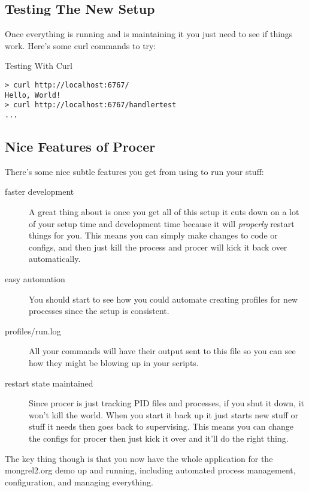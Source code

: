 \subsection{Testing The New Setup}

Once everything is running and  is maintaining it you 
just need to see if things work.  Here's some curl commands to try:

\begin{code}{Testing With Curl}
\begin{Verbatim}
> curl http://localhost:6767/
Hello, World!
> curl http://localhost:6767/handlertest
...
\end{Verbatim}
\end{code}


\subsection{Nice Features of Procer}

There's some nice subtle features you get from using 
to run your stuff:

\begin{description}
\item [faster development]  A great thing about  is once you get all of this setup
    it cuts down on a lot of your setup time and development time because
    it will \emph{properly} restart things for you.  This means you can
    simply make changes to code or configs, and then just kill the process and
    procer will kick it back over automatically.
\item [easy automation]  You should start to see how you could automate creating
    profiles for new processes since the setup is consistent.
\item [profiles/run.log]  All your commands will have their output sent to
    this file so you can see how they might be blowing up in your scripts.
\item [restart state maintained]  Since procer is just tracking PID files and 
    processes, if you shut it down, it won't kill the world.  When you start
    it back up it just starts new stuff or stuff it needs then goes back to
    supervising.  This means you can change the configs for procer then just   
    kick it over and it'll do the right thing.
\end{description}

The key thing though is that you now have the whole application for
the mongrel2.org demo up and running, including automated process management,
configuration, and managing everything.

